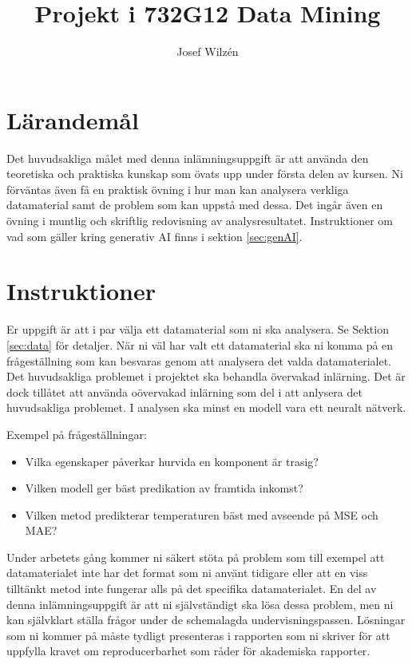 \documentclass[a4paper]{article}
\title{Projekt i 732G12 Data Mining}
\author{Josef Wilzén}
\begin{document}
\maketitle
\thispagestyle{fancy}


\section{Lärandemål}

Det huvudsakliga målet med denna inlämningsuppgift är att använda den teoretiska och 
praktiska kunskap som övats upp under första delen av kursen. Ni förväntas även få 
en praktisk övning i hur man kan analysera verkliga datamaterial samt de problem som 
kan uppstå med dessa. Det ingår även en övning i muntlig och skriftlig redovisning 
av analysresultatet. Instruktioner om vad som gäller kring generativ AI finns i sektion \ref{sec:genAI}.

\section{Instruktioner}

Er uppgift är att i par välja ett datamaterial som ni ska analysera. Se Sektion \ref{sec:data} för detaljer. När ni väl har valt ett datamaterial ska ni komma på en frågeställning som kan besvaras genom att analysera det valda datamaterialet. Det huvudsakliga problemet i projektet ska behandla övervakad inlärning. Det är dock tillåtet att använda oövervakad inlärning som del i att anlysera det huvudsakliga problemet. I analysen ska minst en modell vara ett neuralt nätverk.

Exempel på frågeställningar:
\begin{itemize}
    \item Vilka egenskaper påverkar hurvida en komponent är trasig? 
    \item Vilken modell ger bäst predikation av framtida inkomst?
    \item Vilken metod predikterar temperaturen bäst med avseende på MSE och MAE?
\end{itemize}
Under arbetets gång kommer ni säkert stöta på problem som till exempel att datamaterialet inte har det format som ni använt tidigare eller att en viss tilltänkt metod inte fungerar alls på det specifika datamaterialet. En del av denna inlämningsuppgift är att ni självständigt ska lösa dessa problem, men ni kan självklart ställa frågor under de schemalagda undervisningspassen. Lösningar som ni kommer på måste tydligt presenteras i rapporten som ni skriver för att uppfylla kravet om reproducerbarhet som råder för akademiska rapporter.
\end{document}

